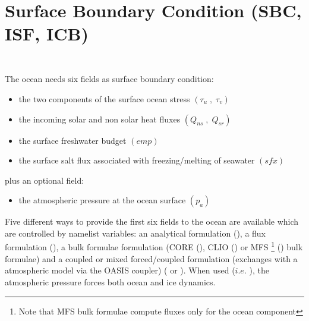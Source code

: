\documentclass[../tex_main/NEMO_manual]{subfiles}
\begin{document}
\chapter{Surface Boundary Condition (SBC, ISF, ICB) }
\label{chap:SBC}
\minitoc

\newpage
$\ $\newline    %

$\ $\newline    %

The ocean needs six fields as surface boundary condition:
\begin{itemize}
\item
  the two components of the surface ocean stress $\left( {\tau _u \;,\;\tau _v} \right)$
\item
  the incoming solar and non solar heat fluxes $\left( {Q_{ns} \;,\;Q_{sr} } \right)$
\item
  the surface freshwater budget $\left( {\textit{emp}} \right)$
\item
  the surface salt flux associated with freezing/melting of seawater $\left( {\textit{sfx}} \right)$
\end{itemize}
plus an optional field:
\begin{itemize}
	\item the atmospheric pressure at the ocean surface $\left( p_a \right)$
\end{itemize}

Five different ways to provide the first six fields to the ocean are available which are controlled by
namelist  variables:
an analytical formulation (),
a flux formulation (),
a bulk formulae formulation (CORE (),
CLIO () or
MFS \footnote { Note that MFS bulk formulae compute fluxes only for the ocean component}
() bulk formulae) and
a coupled or mixed forced/coupled formulation (exchanges with a atmospheric model via the OASIS coupler)
( or ). 
When used ($i.e.$ ),
the atmospheric pressure forces both ocean and ice dynamics.
\end{document}

